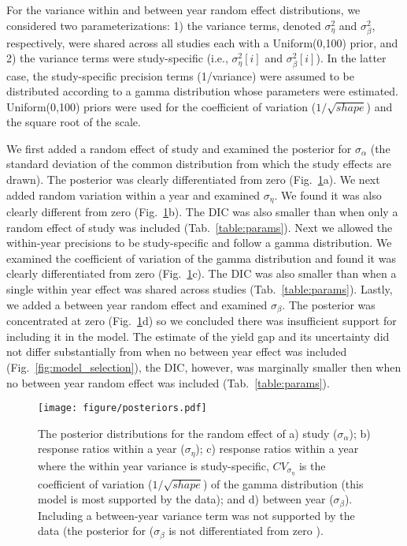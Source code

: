 \documentclass{article}\usepackage[]{graphicx}\usepackage[]{color}
\begin{document}
For the variance within and between year random effect distributions,
we considered two parameterizations: 1) the variance terms, denoted
$\sigma^2_{\eta}$ and $\sigma^2_{\beta}$, respectively, were shared
across all studies each with a Uniform(0,100) prior, and 2) the
variance terms were study-specific (i.e., $\sigma^2_{\eta}[i]$ and
$\sigma^2_{\beta}[i]$). In the latter case, the study-specific
precision terms (1/variance) were assumed to be distributed according
to a gamma distribution whose parameters were
estimated. Uniform(0,100) priors were used for the coefficient of
variation ($1/\sqrt{shape}$) and the square root of the scale.

We first added a random effect of study and examined the posterior for
$\sigma_{\alpha}$ (the standard deviation of the common distribution
from which the study effects are drawn). The posterior was clearly
differentiated from zero (Fig.~\ref{fig:posteriors}a). We next added
random variation within a year and examined $\sigma_{\eta}$. We found
it was also clearly different from zero
(Fig.~\ref{fig:posteriors}b). The DIC was also smaller than when only
a random effect of study was included (Tab.~\ref{table:params}). Next
we allowed the within-year precisions to be study-specific and follow
a gamma distribution. We examined the coefficient of variation of the
gamma distribution and found it was clearly differentiated from zero
(Fig.~\ref{fig:posteriors}c). The DIC was also smaller than when a
single within year effect was shared across studies
(Tab.~\ref{table:params}). Lastly, we added a between year random
effect and examined $\sigma_{\beta}$. The posterior was concentrated
at zero (Fig.~\ref{fig:posteriors}d) so we concluded there was
insufficient support for including it in the model. The estimate of
the yield gap and its uncertainty did not differ substantially from
when no between year effect was included
(Fig.~\ref{fig:model_selection}), the DIC, however, was marginally
smaller then when no between year random effect was included
(Tab.~\ref{table:params}).

\clearpage

\begin{figure}
\centering
\texttt{[image: figure/posteriors.pdf]}
\caption{The posterior distributions for the random effect of a)
study ($\sigma_{\alpha}$); b) response ratios within a year
($\sigma_{\eta}$); c) response ratios within a year where the
within year variance is study-specific, $CV_{\sigma_{\eta}}$ is
the coefficient of variation ($1/\sqrt{shape}$) of the gamma
distribution (this model is most supported by the data); and d)
between year ($\sigma_{\beta}$). Including a between-year variance
term was not supported by the data (the posterior for
($\sigma_{\beta}$ is not differentiated from zero ).}
\label{fig:posteriors}
\end{figure}
\clearpage
\end{document}

